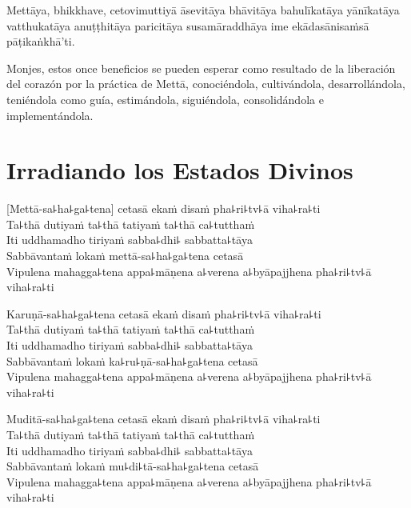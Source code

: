 Mettāya, bhikkhave, cetovimuttiyā āsevitāya bhāvitāya bahulīkatāya yānīkatāya vatthukatāya anuṭṭhitāya paricitāya susamāraddhāya ime ekādasānisaṁsā pāṭikaṅkhā'ti.

\begin{english}
  Monjes, estos once beneficios se pueden esperar como resultado de la liberación del corazón por la práctica de Mettā, conociéndola, cultivándola, desarrollándola, teniéndola como guía, estimándola, siguiéndola, consolidándola e implementándola.
\end{english}

\chapter[Irradiando los Estados Divinos]{Irradiando los Estados Divinos}

\delegateSetUseNext


\begin{leader}
\end{leader}

[Mettā-sa꜕ha꜕ga꜕tena] cetasā ekaṁ disaṁ pha꜕ri꜕tv꜕ā viha꜕ra꜕ti\\
Ta꜕thā dutiyaṁ ta꜕thā tatiyaṁ ta꜕thā ca꜕tutthaṁ\\
Iti uddhamadho tiriyaṁ sabba꜕dhi꜕ sabbatta꜕tāya\\
Sabbāvantaṁ lokaṁ mettā-sa꜕ha꜕ga꜕tena cetasā\\
Vipulena mahagga꜕tena appa꜕māṇena a꜕verena a꜕byāpajjhena pha꜕ri꜕tv꜕ā viha꜕ra꜕ti

\enlargethispage{3\baselineskip}

Karuṇā-sa꜕ha꜕ga꜕tena cetasā ekaṁ disaṁ pha꜕ri꜕tv꜕ā viha꜕ra꜕ti\\
Ta꜕thā dutiyaṁ ta꜕thā tatiyaṁ ta꜕thā ca꜕tutthaṁ\\
Iti uddhamadho tiriyaṁ sabba꜕dhi꜕ sabbatta꜕tāya\\
Sabbāvantaṁ lokaṁ ka꜕ru꜕ṇā-sa꜕ha꜕ga꜕tena cetasā\\
Vipulena mahagga꜕tena appa꜕māṇena a꜕verena a꜕byāpajjhena pha꜕ri꜕tv꜕ā viha꜕ra꜕ti

Muditā-sa꜕ha꜕ga꜕tena cetasā ekaṁ disaṁ pha꜕ri꜕tv꜕ā viha꜕ra꜕ti\\
Ta꜕thā dutiyaṁ ta꜕thā tatiyaṁ ta꜕thā ca꜕tutthaṁ\\
Iti uddhamadho tiriyaṁ sabba꜕dhi꜕ sabbatta꜕tāya\\
Sabbāvantaṁ lokaṁ mu꜕di꜕tā-sa꜕ha꜕ga꜕tena cetasā\\
Vipulena mahagga꜕tena appa꜕māṇena a꜕verena a꜕byāpajjhena pha꜕ri꜕tv꜕ā viha꜕ra꜕ti

